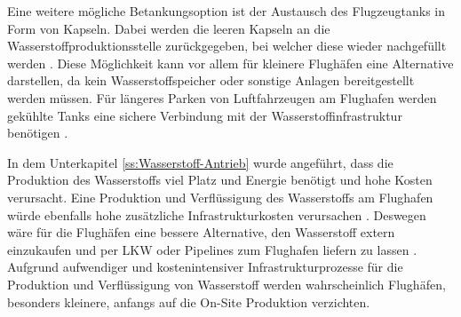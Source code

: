 %
Eine weitere mögliche Betankungsoption ist der Austausch des Flugzeugtanks in Form von Kapseln. 
Dabei werden die leeren Kapseln an die Wasserstoffproduktionsstelle zurückgegeben, 
bei welcher diese wieder nachgefüllt werden \cite{colpan2022fuel}. 
Diese Möglichkeit kann vor allem für kleinere Flughäfen eine Alternative darstellen, 
da kein Wasserstoffspeicher oder sonstige Anlagen bereitgestellt werden müssen.
Für längeres Parken von Luftfahrzeugen am Flughafen werden gekühlte Tanks eine sichere Verbindung 
mit der Wasserstoffinfrastruktur benötigen \cite{colpan2022fuel}. %
%
%
%
%

In dem Unterkapitel \ref{ss:Wasserstoff-Antrieb} wurde angeführt, 
dass die Produktion des Wasserstoffs viel Platz und Energie benötigt und hohe Kosten verursacht. 
Eine Produktion und Verflüssigung des Wasserstoffs am Flughafen würde 
ebenfalls hohe zusätzliche Infrastrukturkosten verursachen \cite{dalmia2022powering}.
Deswegen wäre für die Flughäfen eine bessere Alternative, den Wasserstoff extern einzukaufen 
und per LKW oder Pipelines zum Flughafen liefern zu lassen \cite{gu2023hydrogen}.
Aufgrund aufwendiger und kostenintensiver Infrastrukturprozesse für die Produktion 
und Verflüssigung von Wasserstoff werden wahrscheinlich Flughäfen, 
besonders kleinere, anfangs auf die \glqq On-Site \grqq{} Produktion verzichten.

